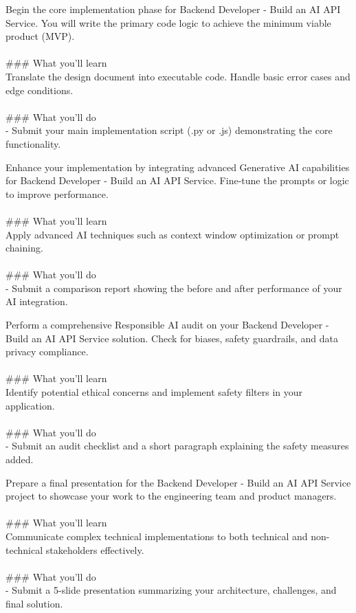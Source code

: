 \documentclass{article}
\begin{document}
Begin the core implementation phase for Backend Developer - Build an AI API Service. You will write the primary code logic to achieve the minimum viable product (MVP). \\
 \\
### What you'll learn \\
Translate the design document into executable code. Handle basic error cases and edge conditions. \\
 \\
### What you'll do \\
- Submit your main implementation script (.py or .js) demonstrating the core functionality.

Enhance your implementation by integrating advanced Generative AI capabilities for Backend Developer - Build an AI API Service. Fine-tune the prompts or logic to improve performance. \\
 \\
### What you'll learn \\
Apply advanced AI techniques such as context window optimization or prompt chaining. \\
 \\
### What you'll do \\
- Submit a comparison report showing the before and after performance of your AI integration.

Perform a comprehensive Responsible AI audit on your Backend Developer - Build an AI API Service solution. Check for biases, safety guardrails, and data privacy compliance. \\
 \\
### What you'll learn \\
Identify potential ethical concerns and implement safety filters in your application. \\
 \\
### What you'll do \\
- Submit an audit checklist and a short paragraph explaining the safety measures added.

Prepare a final presentation for the Backend Developer - Build an AI API Service project to showcase your work to the engineering team and product managers. \\
 \\
### What you'll learn \\
Communicate complex technical implementations to both technical and non-technical stakeholders effectively. \\
 \\
### What you'll do \\
- Submit a 5-slide presentation summarizing your architecture, challenges, and final solution.
\end{document}
